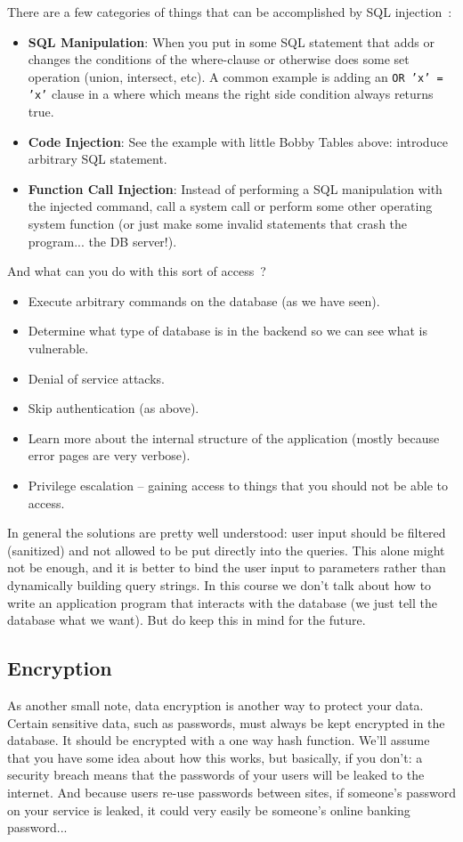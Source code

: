 There are a few categories of things that can be accomplished by SQL injection~\cite{fds}:

\begin{itemize}
	\item \textbf{SQL Manipulation}: When you put in some SQL statement that adds or changes the conditions of the where-clause or otherwise does some set operation (union, intersect, etc). A common example is adding an \texttt{OR 'x' = 'x'} clause in a where which means the right side condition always returns true.
	\item \textbf{Code Injection}: See the example with little Bobby Tables above: introduce arbitrary SQL statement.
	\item \textbf{Function Call Injection}: Instead of performing a SQL manipulation with the injected command, call a system call or perform some other operating system function (or just make some invalid statements that crash the program... the DB server!).
\end{itemize}

And what can you do with this sort of access~\cite{fds}?
\begin{itemize}
	\item Execute arbitrary commands on the database (as we have seen).
	\item Determine what type of database is in the backend so we can see what is vulnerable.
	\item Denial of service attacks.
	\item Skip authentication (as above).
	\item Learn more about the internal structure of the application (mostly because error pages are very verbose).
	\item Privilege escalation -- gaining access to things that you should not be able to access.
\end{itemize}

In general the solutions are pretty well understood: user input should be filtered (sanitized) and not allowed to be put directly into the queries. This alone might not be enough, and it is better to bind the user input to parameters rather than dynamically building query strings. In this course we don't talk about how to write an application program that interacts with the database (we just tell the database what we want). But do keep this in mind for the future.

\subsection*{Encryption}
As another small note, data encryption is another way to protect your data. Certain sensitive data, such as passwords, must always be kept encrypted in the database. It should be encrypted with a one way hash function. We'll assume that you have some idea about how this works, but basically, if you don't: a security breach means that the passwords of your users will be leaked to the internet. And because users re-use passwords between sites, if someone's password on your service is leaked, it could very easily be someone's online banking password...


